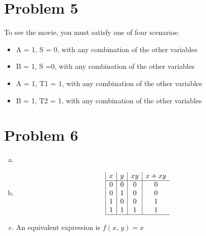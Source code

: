 \section*{Problem 5}
	To see the movie, you must satisfy one of four scenarios:
	
	\begin{itemize}
		\item A = 1, S = 0, with any combination of the other variables
		\item B = 1, S  =0, with any combination of the other variables
		\item A = 1, T1 = 1, with any combination of the other variables
		\item B = 1, T2 = 1, with any combination of the other variables
	\end{itemize}
	

\section*{Problem 6}
	\begin{enumerate}[(a)]
	
	\item {}
	\item
	\begin{displaymath}
	\begin{array}{|c|c|c|c}
	x
	& y
	& xy
	& x + xy \\
	\hline
	0 & 0 & 0 & 0 \\
	0 & 1 & 0 & 0 \\
	1 & 0 & 0 & 1 \\
	1 & 1 & 1 & 1 \\	
	\hline
	\end{array}
	\end{displaymath}		
	
	\item An equivalent expression is $f(x,\, y) = x$
	\end{enumerate}

